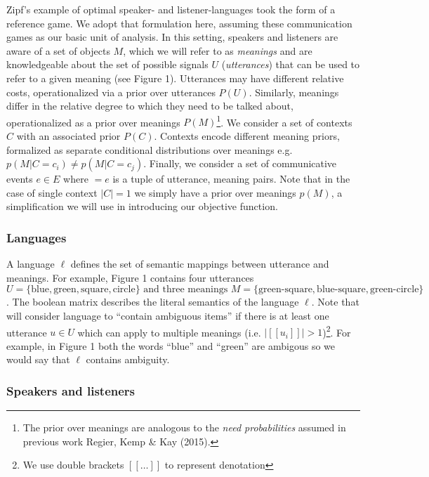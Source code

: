 \documentclass[10pt, letterpaper]{article}
\begin{document}
Zipf's example of optimal speaker- and listener-languages took the form
of a reference game. We adopt that formulation here, assuming these
communication games as our basic unit of analysis. In this setting,
speakers and listeners are aware of a set of objects \(M\), which we
will refer to as \emph{meanings} and are knowledgeable about the set of
possible signals \(U\) (\emph{utterances}) that can be used to refer to
a given meaning (see Figure 1). Utterances may have different relative
costs, operationalized via a prior over utterances \(P(U)\). Similarly,
meanings differ in the relative degree to which they need to be talked
about, operationalized as a prior over meanings
\(P(M)\)\footnote{The prior over meanings are analogous to the \textit{need probabilities} assumed in previous work Regier, Kemp \& Kay (2015).}.
We consider a set of contexts \(C\) with an associated prior \(P(C)\).
Contexts encode different meaning priors, formalized as separate
conditional distributions over meanings e.g.
\(p(M|C=c_i) \neq p(M|C=c_j)\). Finally, we consider a set of
communicative events \(e \in E\) where \(<u, m> = e\) is a tuple of
utterance, meaning pairs. Note that in the case of single context
\(|C|=1\) we simply have a prior over meanings \(p(M)\), a
simplification we will use in introducing our objective function.\par

\subsubsection{Languages}\label{languages}

A language \(\ell\) defines the set of semantic mappings between
utterance and meanings. For example, Figure 1 contains four utterances
\(U = \{\text{blue}, \text{green}, \text{square}, \text{circle}\} \text{ and three meanings }M = \{\text{green-square}, \text{blue-square}, \text{green-circle}\}\).
The boolean matrix describes the literal semantics of the language
\(\ell\). Note that will consider language to ``contain ambiguous
items'' if there is at least one utterance \(u \in U\) which can apply
to multiple meanings (i.e.
\(|[[u_i]]| > 1\))\footnote{We use double brackets $[[\dots]]$ to represent denotation}.
For example, in Figure 1 both the words ``blue'' and ``green'' are
ambigous so we would say that \(\ell\) contains ambiguity.

\subsubsection{Speakers and listeners}\label{speakers-and-listeners}
\end{document}
